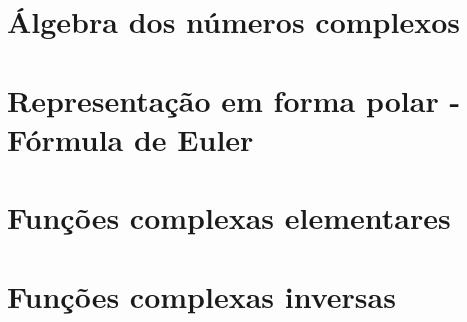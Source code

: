 \section{Álgebra dos números complexos}
\blindtext
\blindtext
\blindtext

\section{Representação em forma polar - Fórmula de Euler}
\blindtext
\blindtext
\blindtext
\blindtext

\section{Funções complexas elementares}
\section{Funções complexas inversas}



